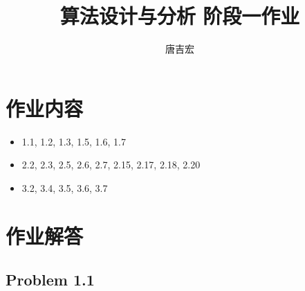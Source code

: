 \documentclass[UTF8,12pt]{article} %
\theoremstyle{definition}
\begin{document}
\title{算法设计与分析 阶段一作业}
\author{唐吉宏}
\maketitle

\section{作业内容}
\begin{itemize}
	\item 1.1, 1.2, 1.3, 1.5, 1.6, 1.7
	\item 2.2, 2.3, 2.5, 2.6, 2.7, 2.15, 2.17, 2.18, 2.20
	\item 3.2, 3.4, 3.5, 3.6, 3.7
\end{itemize}

\section{作业解答}

\subsection*{Problem 1.1}
\end{document}
